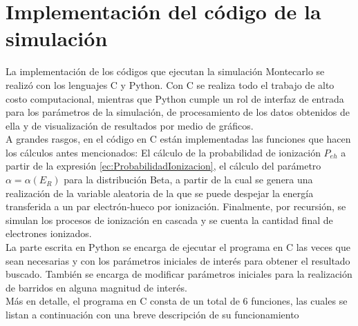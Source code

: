 \appendix
\chapter{Implementación del código de la simulación \label{app:Implementación}}
\noindent La implementación de los códigos que ejecutan la simulación Montecarlo se realizó con los lenguajes C y Python. Con C se realiza todo el trabajo de alto costo computacional, mientras que Python cumple un rol de interfaz de entrada para los parámetros de la simulación, de procesamiento de los datos obtenidos de ella y de visualización de resultados por medio de gráficos.\\
\indent A grandes rasgos, en el código en C están implementadas las funciones que hacen los cálculos antes mencionados: El cálculo de la probabilidad de ionización $P_{eh}$ a partir de la expresión \eqref{ec:ProbabilidadIonizacion}, el cálculo del parámetro $\alpha = \alpha(E_{R})$ para la distribución Beta, a partir de la cual se genera una realización de la variable aleatoria de la que se puede despejar la energía transferida a un par electrón-hueco por ionización. Finalmente, por recursión, se simulan los procesos de ionización en cascada y se cuenta la cantidad final de electrones ionizados.\\
\indent La parte escrita en Python se encarga de ejecutar el programa en C las veces que sean necesarias y con los parámetros iniciales de interés para obtener el resultado buscado. También se encarga de modificar parámetros iniciales para la realización de barridos en alguna magnitud de interés.\\
\indent Más en detalle, el programa en C consta de un total de $6$ funciones, las cuales se listan a continuación con una breve descripción de su funcionamiento

